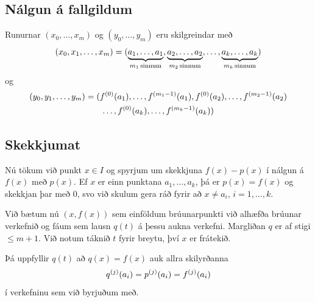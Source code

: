 \documentclass[A4paper,10pt,icelandic]{sphinxmanual}
\begin{document}
\subsection{Nálgun á fallgildum}
\label{kafli03:nalgun-a-fallgildum}
Runurnar \((x_0,\ldots,x_m)\) og \((y_0,\ldots,y_m)\) eru
skilgreindar með
\begin{gather}
\begin{split}(x_0,x_1,\ldots,x_m) =
  (\underbrace{a_1, \ldots, a_1}_{m_1 \, \text{sinnum}},
  \underbrace{a_2, \ldots , a_2}_{m_2 \, \text{sinnum}},
  \ldots ,
  \underbrace{a_k, \ldots , a_k}_{m_k \, \text{sinnum}})\end{split}\notag
\end{gather}
og
\begin{gather}
\begin{split}\begin{gathered}
  (y_0,y_1,\ldots,y_m) =
  (f^{(0)}(a_1), \ldots, f^{(m_1-1)}(a_1),
f^{(0)}(a_2), \ldots, f^{(m_2-1)}(a_2) \\ \ldots,
  f^{(0)}(a_k), \ldots, f^{(m_k-1)}(a_k))
  \label{bru.margfald.5}\end{gathered}\end{split}\notag
\end{gather}

\subsection{Skekkjumat}
\label{kafli03:id8}
Nú tökum við punkt \(x \in I\) og spyrjum um skekkjuna
\(f(x) - p(x)\) í nálgun á \(f(x)\) með \(p(x)\). Ef
\(x\) er einn punktana \(a_1, \ldots, a_k\), þá er
\(p(x) = f(x)\) og skekkjan þar með 0, svo við skulum gera ráð fyrir
að \(x \not= a_i\), \(i = 1, \ldots, k\).

Við bætum nú \((x,f(x))\) sem einföldum brúunarpunkti við alhæfða
brúunar verkefnið og fáum sem lausn \(q(t)\) á þessu aukna verkefni.
Margliðan \(q\) er af stigi \(\leq m+1\). Við notum táknið
\(t\) fyrir breytu, því \(x\) er frátekið.

Þá uppfyllir \(q(t)\) að \(q(x) = f(x)\) auk allra skilyrðanna
\begin{gather}
\begin{split}q^{(j)}(a_i) = p^{(j)}(a_i) = f^{(j)}(a_i)\end{split}\notag
\end{gather}
í verkefninu sem við byrjuðum með.
\end{document}
